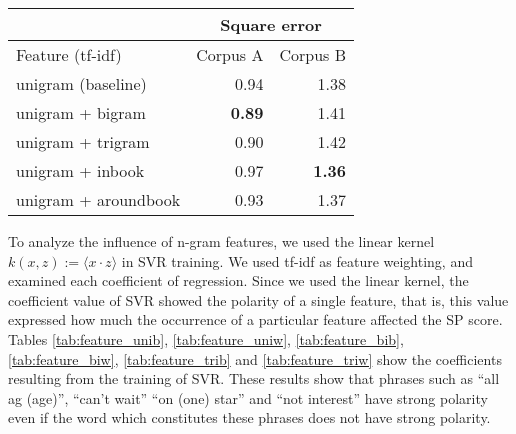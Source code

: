 \documentclass[japanese]{jnlp_1.3d}
\begin{document}
\begin{table}[t]
	\label{tab:feature4}
	  \begin{center}
  \begin{tabular}{|l|rr|} \hline
                    & \multicolumn{2}{|c|}{Square error}\\ \hline
   Feature (tf-idf) & Corpus A & Corpus B\\ \hline
    unigram (baseline)   & 0.94                    & 1.38      \\ 
	unigram + bigram     & \textbf{0.89}           & 1.41       \\
	unigram + trigram    & 0.90                    & 1.42       \\
	unigram + inbook     & 0.97                    & \textbf{1.36}\\
    unigram + aroundbook & 0.93                    & 1.37 \\ \hline
  \end{tabular}
  \end{center}
\end{table}

To analyze the influence of n-gram features, we used the linear kernel $k(x,z) := \langle x \cdot z \rangle$ in SVR training. We used tf-idf as feature weighting, and examined each coefficient of regression. Since we used the linear kernel, the coefficient value of SVR showed the polarity of a single feature, that is, this value expressed how much the occurrence of a particular feature affected the SP score. Tables \ref{tab:feature_unib}, \ref{tab:feature_uniw}, \ref{tab:feature_bib}, \ref{tab:feature_biw}, \ref{tab:feature_trib} and \ref{tab:feature_triw} show the coefficients resulting from the training of SVR. These results show that phrases such as ``all ag (age)'', ``can't wait'' ``on (one) star'' and ``not interest'' have strong polarity even if the word which constitutes these phrases does not have strong polarity.
\end{document}
